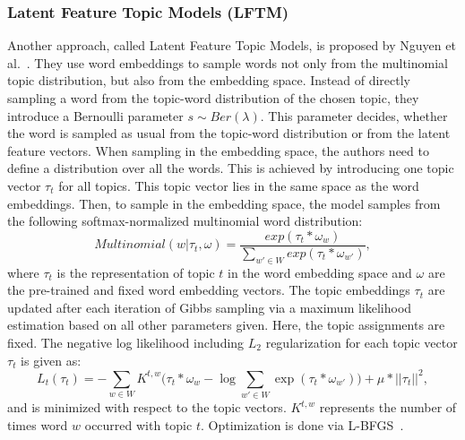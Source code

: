 \documentclass[
        a4paper,
        titlepage,
        twoside,
        parskip,
        numbers=noenddot
        ]{scrbook}
\theoremstyle{break}
\begin{document}
\subsubsection{Latent Feature Topic Models (LFTM)}
Another approach, called Latent Feature Topic Models, is proposed by Nguyen et al.~\cite{Nguyen2015}.
They use word embeddings to sample words not only from the multinomial topic distribution, but also from the embedding space.
Instead of directly sampling a word from the topic-word distribution of the chosen topic, they introduce a Bernoulli parameter $s \sim Ber(\lambda)$.
This parameter decides, whether the word is sampled as usual from the topic-word distribution or from the latent feature vectors.
When sampling in the embedding space, the authors need to define a distribution over all the words.
This is achieved by introducing one topic vector $\tau_t$ for all topics.
This topic vector lies in the same space as the word embeddings.
Then, to sample in the embedding space, the model samples from the following softmax-normalized multinomial word distribution:
\begin{equation*}
    Multinomial(w | \tau_t, \omega) = \frac{exp(\tau_t * \omega_w)}{\sum_{w' \in W} exp(\tau_t * \omega_{w'})},
\end{equation*}
where $\tau_t$ is the representation of topic $t$ in the word embedding space and $\omega$ are the pre-trained and fixed word embedding vectors.
The topic embeddings $\tau_t$ are updated after each iteration of Gibbs sampling via a maximum likelihood estimation based on all other parameters given.
Here, the topic assignments are fixed.
The negative log likelihood including $L_2$ regularization for each topic vector $\tau_t$ is given as:
\begin{equation*}
  L_t(\tau_t) = - \sum_{w \in W} K^{t,w} \Big(\tau_t * \omega_w - \log \sum_{w' \in W} \exp (\tau_t * \omega_{w'}) \Big) + \mu * || \tau_t ||^2,
\end{equation*}
and is minimized with respect to the topic vectors.
$K^{t,w}$ represents the number of times word $w$ occurred with topic $t$.
Optimization is done via L-BFGS~\cite{Liu1989}.
\end{document}
